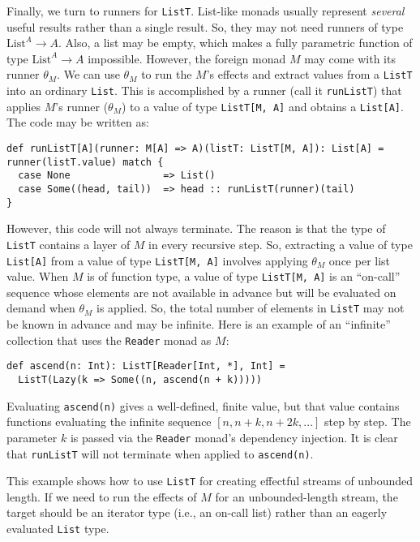Finally, we turn to runners for \lstinline!ListT!. List-like monads
usually represent \emph{several} useful results rather than a single
result. So, they may not need runners of type $\text{List}^{A}\rightarrow A$.
Also, a list may be empty, which makes a fully parametric function
of type $\text{List}^{A}\rightarrow A$ impossible. However, the foreign
monad $M$ may come with its runner $\theta_{M}$. We can use $\theta_{M}$
to run the $M$\textsf{'}s effects and extract values from a \lstinline!ListT!
into an ordinary \lstinline!List!. This is accomplished by a runner
(call it \lstinline!runListT!) that applies $M$\textsf{'}s runner ($\theta_{M}$)
to a value of type \lstinline!ListT[M, A]! and obtains a \lstinline!List[A]!.
The code may be written as:
\begin{lstlisting}
def runListT[A](runner: M[A] => A)(listT: ListT[M, A]): List[A] = runner(listT.value) match {
  case None                => List()
  case Some((head, tail))  => head :: runListT(runner)(tail)
}
\end{lstlisting}
However, this code will not always terminate. The reason is that the
type of \lstinline!ListT! contains a layer of $M$ in every recursive
step. So, extracting a value of type \lstinline!List[A]! from a value
of type \lstinline!ListT[M, A]! involves applying $\theta_{M}$ once
per list value. When $M$ is of function type, a value of type \lstinline!ListT[M, A]!
is an \textsf{``}on-call\textsf{''} sequence whose elements
are not available in advance but will be evaluated on demand when
$\theta_{M}$ is applied. So, the total number of elements in \lstinline!ListT!
may not be known in advance and may be infinite. Here is an example
of an \textsf{``}infinite\textsf{''} collection that uses the \lstinline!Reader!
monad as $M$:
\begin{lstlisting}
def ascend(n: Int): ListT[Reader[Int, *], Int] =
  ListT(Lazy(k => Some((n, ascend(n + k)))))
\end{lstlisting}
Evaluating \lstinline!ascend(n)! gives a well-defined, finite value,
but that value contains functions evaluating the infinite sequence
$\left[n,n+k,n+2k,...\right]$ step by step. The parameter $k$ is
passed via the \lstinline!Reader! monad\textsf{'}s dependency injection. It
is clear that \lstinline!runListT! will not terminate when applied
to \lstinline!ascend(n)!. 

This example shows how to use \lstinline!ListT! for creating effectful
streams of unbounded length. If we need to run the effects of $M$
for an unbounded-length stream, the target should be an iterator type
(i.e., an on-call list) rather than an eagerly evaluated \lstinline!List!
type.

